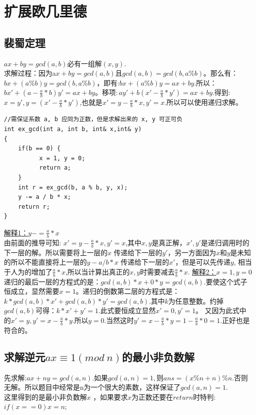 \section{扩展欧几里德}

\subsection{裴蜀定理}
$ax + by = gcd(a, b)必有一组解(x,y)$. \\

求解过程：因为a$x + by = gcd(a, b)$且$gcd(a, b) = gcd(b, a \% b)$。那么有：$bx + (a \% b)y = gcd(b, a \% b)$，即有:$ bx + (a \% b)y = ax + by$.所以：$bx' + (a - \frac{a}{b} * b)y' = ax + by。$移项$:ay' + b(x' -\frac{ a}{b} * y') = ax + by$.得到: $x = y', y = (x' - \frac{a} {b} * y')$,也就是$x' = y - \frac{a} {b} * x, y' = x$.所以可以使用递归求解。

\begin{lstlisting}
//需保证系数 a, b 应同为正数，但是求解出来的 x, y 可正可负
int ex_gcd(int a, int b, int& x,int& y)
{
    if(b == 0) {
          x = 1, y = 0;
          return a;
    }
    int r = ex_gcd(b, a % b, y, x);
    y -= a / b * x;
    return r;
}
\end{lstlisting}
\underline{解释1：$y -= \frac{a}{b} * x$} \\

由前面的推导可知: $x' = y -\frac{a}{b} * x, y' = x$,其中$x,y$是真正解，$x',y'$是递归调用时的下一层的解。所以需要将上一层的$x$ 传递给下一层的$y'$，另一方面因为$x$和$y$是未知的所以不能直接将上一层的$y - a / b * x$ 传递给下一层的$x'$，但是可以先传递$y$, 相当于人为的增加了$\frac{a}{b} * x$,所以当计算出真正的$x,y$时需要减去$\frac{a}{ b }*x$.
\underline{解释2：$ x = 1, y = 0$} \\

递归的最后一层的方程式的是：$gcd(a,b) * x + 0 * y = gcd(a, b)$.要使这个式子恒成立，显然需要$x = 1。$递归的倒数第二层的方程式是：$k * gcd(a, b) * x' + gcd(a, b) * y' = gcd(a, b)$.其中$k$为任意整数。约掉$gcd(a, b)$可得：$k * x' + y' = 1.$此式要恒成立显然$x' = 0, y' = 1$。 又因为此式中的$x' = y, y' = x - \frac{a} {b} * y$.所以$y = 0$.当然这时$y' = x - \frac{a}{b} * y = 1 -\frac{a}{b} * 0 = 1$.正好也是符合的。

\subsection{求解逆元$ax \equiv 1 (mod\  n)$的最小非负数解}
先求解:$ax + ny = gcd(a, n)$.如果$gcd(a, n) = 1,$则$ans = (x \% n + n) \% n$.否则无解。所以题目中经常是n为一个很大的素数，这样保证了$gcd(a, n) = 1.$ \\
这里得到的是最小非负数解$x$ ，如果要求$x$为正数还要在$return$时特判:$if(x == 0) x = n;$

